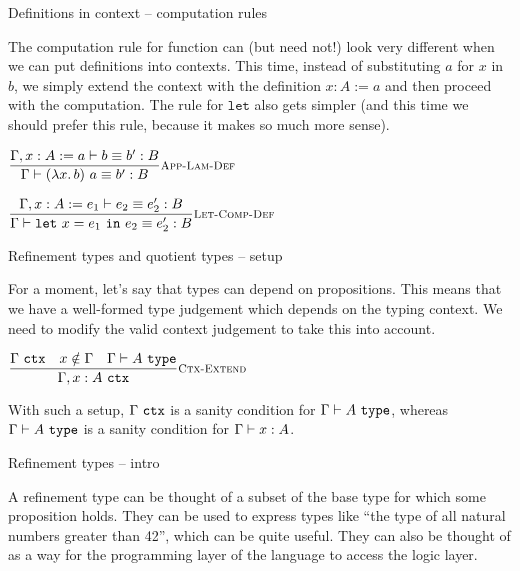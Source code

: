 \documentclass{beamer}
\begin{document}
\begin{frame}{Definitions in context -- computation rules}

The computation rule for function can (but need not!) look very different when we can put definitions into contexts. This time, instead of substituting $a$ for $x$ in $b$, we simply extend the context with the definition $x : A := a$ and then proceed with the computation. The rule for $\texttt{let}$ also gets simpler (and this time we should prefer this rule, because it makes so much more sense).

\vspace{2em}

\begin{center}
  $\infrule[App-Lam-Def]{\compeq[\extend{\Gamma}{x}{A}[a]]{b}{b'}{B}}{\compeq{\app{(\fun{x}{b})}{a}}{b'}{B}}$

  \vspace{2em}

  $\infrule[Let-Comp-Def]{\compeq[\extend{\Gamma}{x}{A}[e_1]]{e_2}{e_2'}{B}}{\compeq{\letin{x}{e_1}{e_2}}{e_2'}{B}}$
\end{center}

\end{frame}

\begin{frame}{Refinement types and quotient types -- setup}

For a moment, let's say that types can depend on propositions. This means that we have a well-formed type judgement which depends on the typing context. We need to modify the valid context judgement to take this into account.

\vspace{2em}

\begin{center}
  $\infrule[Ctx-Extend]{\ctx{\Gamma} \quad \sidecond{x \notin \Gamma} \quad \type{A}}{\ctx{\extend{\Gamma}{x}{A}}}$
\end{center}

\vspace{2em}

With such a setup, $\Gamma\ \texttt{ctx}$ is a sanity condition for $\type{A}$, whereas $\type{A}$ is a sanity condition for $\typing{x}{A}$.

\end{frame}

\newcommand{\refinement}[3]{\{#1 : #2\ |\ #3\}}
\newcommand{\refine}[1]{\texttt{refine}\ #1}
\newcommand{\unrefine}[1]{\texttt{unrefine}\ #1}

\begin{frame}{Refinement types -- intro}

A refinement type can be thought of a subset of the base type for which some proposition holds. They can be used to express types like ``the type of all natural numbers greater than 42'', which can be quite useful. They can also be thought of as a way for the programming layer of the language to access the logic layer.

\end{frame}
\end{document}

